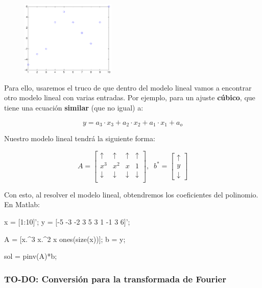 \documentclass[11pt]{scrartcl}
\begin{document}
\begin{figure}[h!]
  \centering
  \includegraphics[width=0.4\textwidth]{img/modelopolinomico_1}
\end{figure}

Para ello, usaremos el truco de que dentro del modelo lineal vamos a encontrar
otro modelo lineal con varias entradas. Por ejemplo, para un ajuste
\textbf{cúbico}, que tiene una ecuación \textbf{similar} (que no igual) a:

\[
y = a_3 \cdot x_3 + a_2 \cdot x_2 + a_1 \cdot x_1 + a_o
\]

Nuestro modelo lineal tendrá la siguiente forma:

\[
A =
\begin{bmatrix}
\uparrow & \uparrow & \uparrow & \uparrow\\
x^3 & x^2 & x & 1 \\
\downarrow & \downarrow & \downarrow & \downarrow \\
\end{bmatrix}, 
\;\; b^* =
\begin{bmatrix}
\uparrow \\
y \\
\downarrow  
\end{bmatrix}
\]

Con esto, al resolver el modelo lineal, obtendremos los coeficientes del
polinomio. En Matlab:

\begin{matlabcode}
x = [1:10]';
y = [-5 -3 -2  3 5 3 1 -1 3 6]';

A = [x.^3 x.^2 x ones(size(x))];
b = y;

sol = pinv(A)*b;

\end{matlabcode}

\subsubsection{TO-DO: Conversión para la transformada de Fourier}
\end{document}
